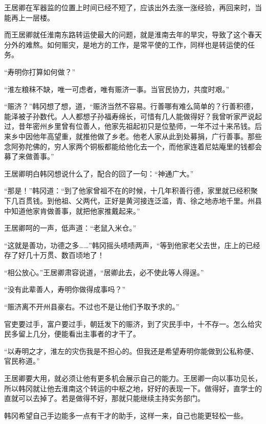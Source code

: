 王居卿在军器监的位置上时间已经不短了，应该出外去涨一涨经验，再回来时，当能再上一层楼。

而王居卿就任淮南东路转运使最大的问题，就是淮南去年的旱灾，导致了这个春天分外的难熬。如何赈灾，是地方的工作，是常平使的工作，同样也是转运使的任务。

“寿明你打算如何做？”

“淮左粮秣不缺，唯一可虑者，唯有赈济一事。当官民协力，共度时艰。”

“赈济？”韩冈想了想，道，“赈济当然不容易。行善哪有难么简单的？行善积德，能泽被子孙数代。人人都想子孙福寿绵长，可惜有几人能做得好？我曾听家严说起过，昔年密州乡里曾有位善人，他家先祖起初只是位塾师，一年不过十来吊钱。后来乡中因他年高望重，就推他做了乡老。他老人家从此到处募捐，广行善事。那些念阿弥陀佛的，穷人家两个铜板都能给他化去一个，而他家连着尼姑庵里的钱都会募了来做善事。”

王居卿明白韩冈想说什么了，配合的回了一句：“神通广大。”

“那是！”韩冈道：“到了他家曾祖不在的时候，十几年积善行德，家里就已经积聚下几百贯钱。到他祖、父两代，正好是黄河接连泛滥，青、徐之地赤地千里。州县中知道他家肯做善事，就把他家推戴起来。”

王居卿呵的一声，低声道：“老鼠入米仓。”

“这就是善功，功德之多……”韩冈摇头啧啧两声，“等到他家老父去世，庄上的已经存了好几十万贯、数百顷地了！

“相公放心。”王居卿肃容说道，“居卿此去，必不使此等人得逞。”

“没有此辈善人，寿明你做得成事吗？”

“赈济离不开州县豪右。不过也不是让他们予取予求的。”

官吏要过手，富户要过手，朝廷发下的赈济，到了灾民手中，十不存一。怎么给灾民多留上几分，便能看出主事者的才干了。

“以寿明之才，淮左的灾伤我是不担心的。但我还是希望寿明你能做到公私称便、官民称道。”

王居卿要大用，就必须让他有更多机会展示自己的能力。王居卿一向以事功见长，所以韩冈就让他去淮南这个转运的中枢之地，好好的表现一下。做得好，直学士的直就可以去掉了。若是做得不好，那就只能继续主持实务部门。

韩冈希望自己手边能多一点有干才的助手，这样一来，自己也能更轻松一些。

